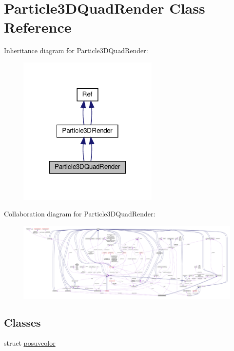 \hypertarget{classParticle3DQuadRender}{}\section{Particle3\+D\+Quad\+Render Class Reference}
\label{classParticle3DQuadRender}


Inheritance diagram for Particle3\+D\+Quad\+Render\+:
\nopagebreak
\begin{figure}[H]
\begin{center}
\leavevmode
\includegraphics[width=197pt]{classParticle3DQuadRender__inherit__graph}
\end{center}
\end{figure}


Collaboration diagram for Particle3\+D\+Quad\+Render\+:
\nopagebreak
\begin{figure}[H]
\begin{center}
\leavevmode
\includegraphics[width=350pt]{classParticle3DQuadRender__coll__graph}
\end{center}
\end{figure}
\subsection*{Classes}
\begin{DoxyCompactItemize}
\item 
struct \hyperlink{structParticle3DQuadRender_1_1posuvcolor}{posuvcolor}
\end{DoxyCompactItemize}
